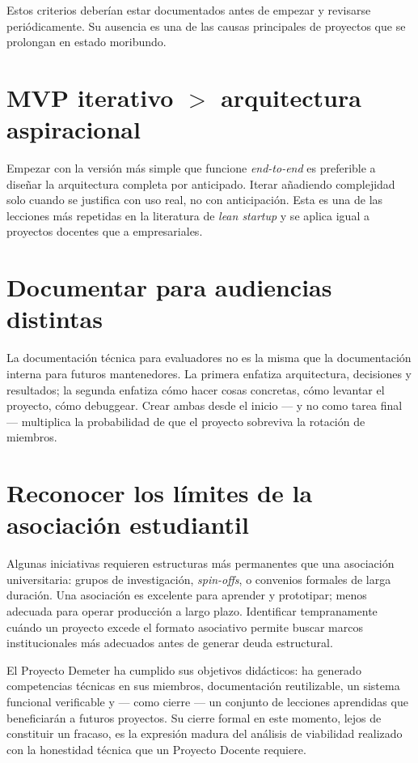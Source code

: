Estos criterios deber\'ian estar documentados antes de empezar y
revisarse peri\'odicamente. Su ausencia es una de las causas principales
de proyectos que se prolongan en estado moribundo.

\section{MVP iterativo $>$ arquitectura aspiracional}

Empezar con la versi\'on m\'as simple que funcione \textit{end-to-end} es
preferible a dise\~nar la arquitectura completa por anticipado. Iterar
a\~nadiendo complejidad solo cuando se justifica con uso real, no con
anticipaci\'on. Esta es una de las lecciones m\'as repetidas en la
literatura de \textit{lean startup} y se aplica igual a proyectos
docentes que a empresariales.

\section{Documentar para audiencias distintas}

La documentaci\'on t\'ecnica para evaluadores no es la misma que la
documentaci\'on interna para futuros mantenedores. La primera enfatiza
arquitectura, decisiones y resultados; la segunda enfatiza c\'omo hacer
cosas concretas, c\'omo levantar el proyecto, c\'omo debuggear. Crear
ambas desde el inicio --- y no como tarea final --- multiplica la
probabilidad de que el proyecto sobreviva la rotaci\'on de miembros.

\section{Reconocer los l\'imites de la asociaci\'on estudiantil}

Algunas iniciativas requieren estructuras m\'as permanentes que una
asociaci\'on universitaria: grupos de investigaci\'on, \textit{spin-offs},
o convenios formales de larga duraci\'on. Una asociaci\'on es excelente
para aprender y prototipar; menos adecuada para operar producci\'on a
largo plazo. Identificar tempranamente cu\'ando un proyecto excede el
formato asociativo permite buscar marcos institucionales m\'as
adecuados antes de generar deuda estructural.

\bigskip

\begin{conclusionbox}
El Proyecto Demeter ha cumplido sus objetivos did\'acticos: ha generado
competencias t\'ecnicas en sus miembros, documentaci\'on reutilizable,
un sistema funcional verificable y --- como cierre --- un conjunto de
lecciones aprendidas que beneficiar\'an a futuros proyectos. Su cierre
formal en este momento, lejos de constituir un fracaso, es la
expresi\'on madura del an\'alisis de viabilidad realizado con la
honestidad t\'ecnica que un Proyecto Docente requiere.
\end{conclusionbox}

